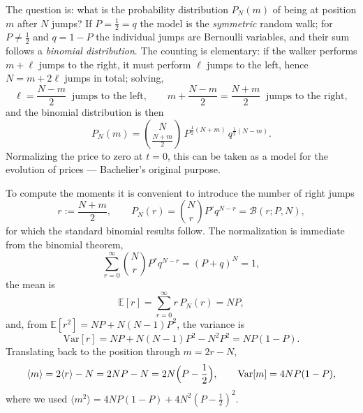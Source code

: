\begin{center}
\end{center}

The question is: what is the probability distribution $P_N(m)$ of being at position $m$ after $N$ jumps?
If $P=\tfrac{1}{2}=q$ the model is the \emph{symmetric} random walk; for $P\ne\tfrac{1}{2}$ and $q=1-P$ the individual jumps are Bernoulli variables, and their sum follows a \emph{binomial distribution}.
The counting is elementary: if the walker performs $m+\ell$ jumps to the right, it must perform $\ell$ jumps to the left, hence $N=m+2\ell$ jumps in total; solving,
\begin{equation}
\ell=\frac{N-m}{2} \ \text{ jumps to the left},
\qquad
m+\frac{N-m}{2}=\frac{N+m}{2} \ \text{ jumps to the right},
\end{equation}
and the binomial distribution is then
\begin{equation}
P_N(m) = \binom{N}{\frac{N+m}{2}}\, P^{\frac{1}{2}(N+m)}\, q^{\frac{1}{2}(N-m)}.
\end{equation}
Normalizing the price to zero at $t=0$, this can be taken as a model for the evolution of prices --- Bachelier's original purpose.

To compute the moments it is convenient to introduce the number of right jumps
\begin{equation}
r:=\frac{N+m}{2},
\qquad
P_N(r)=\binom{N}{r}P^r q^{N-r} = \mathcal{B}(r;P,N),
\end{equation}
for which the standard binomial results follow.
The normalization is immediate from the binomial theorem,
\begin{equation}
\sum_{r=0}^{\infty}\binom{N}{r}P^r q^{N-r} = (P+q)^N = 1,
\end{equation}
the mean is
\begin{equation}
\mathbb{E}[r]=\sum_{r=0}^{\infty} r\,P_N(r) = NP,
\end{equation}
and, from $\mathbb{E}[r^2]=NP+N(N-1)P^2$, the variance is
\begin{equation}
\mathrm{Var}[r]= NP+N(N-1)P^2-N^2P^2 = NP(1-P).
\end{equation}
Translating back to the position through $m=2r-N$,
\begin{equation}
\langle m\rangle = 2\langle r\rangle - N = 2NP-N = 2N\Bigl(P-\frac{1}{2}\Bigr),
\qquad
\mathrm{Var}[m] = 4NP(1-P),
\end{equation}
where we used $\langle m^2\rangle = 4NP(1-P)+4N^2(P-\tfrac{1}{2})^2$.

